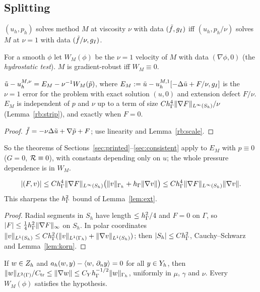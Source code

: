 \subsection{Splitting}

\begin{lemma}[Scaling]\label{rb:scale}
$(u_h,p_h)$ solves method $M$ at viscosity $\nu$ with data $(\tilde f,g_I)$ iff $(u_h,p_h/\nu)$ solves $M$ at $\nu=1$ with data $(\tilde f/\nu,g_I)$.
\end{lemma}

For a smooth $\phi$ let $W_M(\phi)$ be the $\nu=1$ velocity of $M$ with data $(\nabla\phi,0)$ (the \emph{hydrostatic test}). $M$ is gradient-robust iff $W_M\equiv0$.

\begin{theorem}[Splitting]\label{rb:split}
$\tilde u-u_h^{M,\nu}=E_M-\nu^{-1}W_M(\tilde p)$, where $E_M:=\tilde u-u_h^{M,1}[-\Delta\tilde u+F/\nu,g_I]$ is the $\nu=1$ error for the problem with exact solution $(u,0)$ and extension defect $F/\nu$. $E_M$ is independent of $p$ and $\nu$ up to a term of size $Ch_\Gamma^4\lVert \nabla F\rVert_{L^\infty(S_h)}/\nu$ (Lemma~\ref{rb:strip}), and exactly when $F=0$.
\end{theorem}

\begin{proof}
$\tilde f=-\nu\Delta\tilde u+\nabla\tilde p+F$; use linearity and Lemma~\ref{rb:scale}.
\end{proof}

So the theorems of Sections~\ref{sec:printed}--\ref{sec:consistent} apply to $E_M$ with $p\equiv0$ ($G=0$, $\mathcal R\equiv0$), with constants depending only on $u$; the whole pressure dependence is in $W_M$.

\begin{lemma}\label{rb:strip}
\[
|(F,v)|\le Ch_\Gamma^4\lVert \nabla F\rVert_{L^\infty(S_h)}\bigl(\lVert v\rVert_{\Gamma_h}+h_\Gamma\lVert \nabla v\rVert\bigr)\le Ch_\Gamma^4\lVert \nabla F\rVert_{L^\infty(S_h)}\lVert \nabla v\rVert.
\] This sharpens the $h_\Gamma^2$ bound of Lemma~\ref{lem:ext}.
\end{lemma}

\begin{proof}
Radial segments in $S_h$ have length $\le h_\Gamma^2/4$ and $F=0$ on $\Gamma$, so $|F|\le\frac14h_\Gamma^2\lVert \nabla F\rVert_\infty$ on $S_h$. In polar coordinates $\lVert v\rVert_{L^1(S_h)}\le Ch_\Gamma^2(\lVert v\rVert_{L^1(\Gamma_h)}+\lVert \nabla v\rVert_{L^1(S_h)})$; then $|S_h|\le Ch_\Gamma^2$, Cauchy--Schwarz and Lemma~\ref{lem:korn}.
\end{proof}

\begin{lemma}\label{rb:harm}
If $w\in Z_h$ and $a_h(w,y)-\langle w,\, \partial_n y\rangle=0$ for all $y\in Y_h$, then $\lVert w\rVert_{L^2(\Gamma)}/C_{\rm tr}\le\lVert \nabla w\rVert\le C_Yh_\Gamma^{-1/2}\lVert w\rVert_{\Gamma_h}$, uniformly in $\mu$, $\gamma$ and $\nu$. Every $W_M(\phi)$ satisfies the hypothesis.
\end{lemma}

